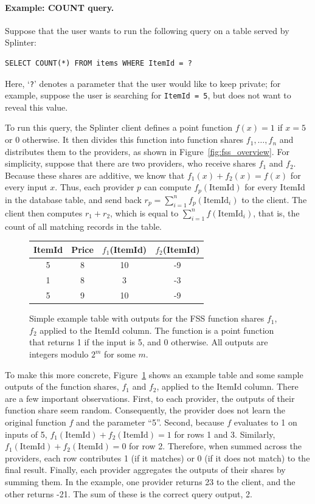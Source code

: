 \paragraph{Example: COUNT query.}
Suppose that the user wants to run the following query on
a table served by Splinter:
\begin{verbatim}
SELECT COUNT(*) FROM items WHERE ItemId = ?
\end{verbatim}

Here, `\texttt{?}' denotes a parameter that the user would like to keep
private; for example, suppose the user is searching for \texttt{ItemId = 5},
but does not want to reveal this value.

To run this query, the Splinter client defines a point function $f(x)=1$ if $x=5$
or 0 otherwise.
It then divides this function into function shares $f_1,\dots,f_n$ and
distributes them to the providers, as shown in Figure~\ref{fig:fss_overview}.
For simplicity, suppose that there are two providers, who receive shares
$f_1$ and $f_2$.
Because these shares are additive, we know that $f_1(x)+f_2(x)=f(x)$
for every input $x$.
Thus, each provider $p$ can compute $f_p(\mathrm{ItemId})$ for every ItemId in the
database table, and send back $r_p = \sum_{i=1}^n f_p(\mathrm{ItemId}_i)$
to the client.
The client then computes $r_1 + r_2$, which is equal
to $\sum_{i=1}^n f(\mathrm{ItemId}_i)$, that is, the count of all matching
records in the table.

\begin{figure}
	\centering
		\begin{tabular}{cccc}
			\toprule
			\bf ItemId & \bf Price & $f_1$(ItemId) & $f_2$(ItemId) \\
			\midrule
			5 & 8 & 10 & -9 \\
			1 & 8 & 3 & -3 \\
			5 & 9 & 10 & -9 \\
			\bottomrule
		\end{tabular}
	\caption[Function Secret Sharing example outputs.]{Simple example table with outputs for the FSS function shares $f_1$, $f_2$ applied to the ItemId column. 
		The function
		is a point function that returns 1 if the input is 5, and 0 otherwise.
		All outputs are integers modulo $2^m$ for some $m$.
	}
	\label{fig:fssExample2}
\end{figure}

To make this more concrete, Figure~\ref{fig:fssExample2} shows an example
table and some sample outputs of the function shares, $f_1$ and $f_2$,
applied to the ItemId column. 
There are a few important observations. First, to each provider,
the outputs of their function share seem random. Consequently, the provider does not learn
the original function $f$ and the parameter ``5''. Second, 
because $f$ evaluates 
to 1 on inputs of 5, $f_1(\mathrm{ItemId}) + f_2(\mathrm{ItemId}) = 1$ for rows 1 and 3. 
Similarly, $f_1(\mathrm{ItemId}) + f_2(\mathrm{ItemId})=0$ for row 2.
Therefore, when summed across the providers, each row
contributes 1 (if it matches) or 0 (if it does not match) to the 
final result. 
Finally, each provider aggregates the outputs of their shares by summing them. 
In the example, one provider returns 23 to the client, and
the other returns -21.
The sum of these is the correct query output, 2.

